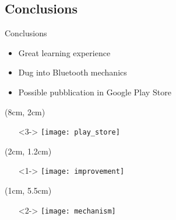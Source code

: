 \subsection{Conclusions}
\begin{frame}{Conclusions}
  \begin{itemize}
   \item<1-> Great learning experience
   \item<2-> Dug into Bluetooth mechanics
   \item<3-> Possible pubblication in Google Play Store
  \end{itemize}
  
  \begin{textblock*}{5cm}(8cm, 2cm)
  \begin{itemize}
    \item[] <3-> \texttt{[image: play\_store]}
  \end{itemize}
  \end{textblock*}
  
  \begin{textblock*}{5cm}(2cm, 1.2cm)
  \begin{itemize}
   \item[] <1-> \texttt{[image: improvement]}
  \end{itemize}
  \end{textblock*}
  
  \begin{textblock*}{5cm}(1cm, 5.5cm)
   \begin{itemize}
    \item[] <2-> \texttt{[image: mechanism]}
   \end{itemize}

  \end{textblock*}


\end{frame}
